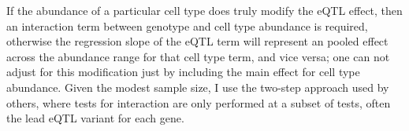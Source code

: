 
If the abundance of a particular cell type does truly modify the \gls{eQTL} effect, 
then an interaction term between genotype and cell type abundance is required, %
otherwise the regression slope of the \gls{eQTL} term will represent an pooled effect across the abundance range for that cell type term, and vice versa;
one can not adjust for this modification just by including the main effect for cell type abundance.
%
Given the modest sample size, I use the two-step approach used by others\autocite{westra2015CellSpecificEQTL,peters2016InsightGenotypePhenotypeAssociations,kim-hellmuth2017GeneticRegulatoryEffects,davenport2018DiscoveringVivoCytokineeQTL},
where tests for interaction are only performed at a subset of tests, often the lead \gls{eQTL} variant for each gene.

